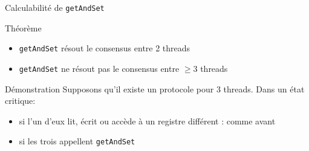 
\begingroup

\begin{frame}[fragile]{Calculabilité de \lstinline{getAndSet}}

  \begin{alertblock}{Théorème}
    \begin{itemize}
    \item \lstinline{getAndSet} résout le consensus entre 2 threads
    \item \lstinline{getAndSet} ne résout pas le consensus entre $\ge 3$ threads
    \end{itemize}
  \end{alertblock}

  \begin{block}{Démonstration}
    Supposons qu'il existe un protocole pour 3 threads. Dans un état critique:
    \begin{itemize}
    \item si l'un d'eux lit, écrit ou accède à un registre différent : comme avant
    \item si les trois appellent \lstinline{getAndSet}
    \end{itemize}
    \vspace{-3mm}
    \begin{center}
    \end{center}
  \end{block}

\end{frame}

\endgroup
\endinput
